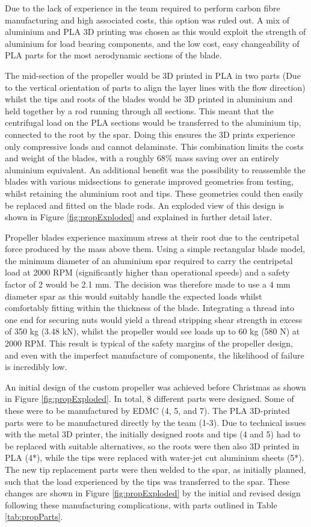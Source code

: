 Due to the lack of experience in the team required to perform carbon fibre manufacturing and high associated costs, this option was ruled out. A mix of aluminium and PLA 3D printing was chosen as this would exploit the strength of aluminium for load bearing components, and the low cost, easy changeability of PLA parts for the most aerodynamic sections of the blade.

The mid-section of the propeller would be 3D printed in PLA in two parts (Due to the vertical orientation of parts to align the layer lines with the flow direction) whilst the tips and roots of the blades would be 3D printed in aluminium and held together by a rod running through all sections. This meant that the centrifugal load on the PLA sections would be transferred to the aluminium tip, connected to the root by the spar. Doing this ensures the 3D prints experience only compressive loads and cannot delaminate. This combination limits the costs and weight of the blades, with a roughly 68\% mass saving over an entirely aluminium equivalent. An additional benefit was the possibility to reassemble the blades with various midsections to generate improved geometries from testing, whilst retaining the aluminium root and tips. These geometries could then easily be replaced and fitted on the blade rods. An exploded view of this design is shown in Figure \ref{fig:propExploded} and explained in further detail later.

Propeller blades experience maximum stress at their root due to the centripetal force produced by the mass above them. Using a simple rectangular blade model, the minimum diameter of an aluminium spar required to carry the centripetal load at 2000 RPM (significantly higher than operational speeds) and a safety factor of 2  would be 2.1 mm. The decision was therefore made to use a 4 mm diameter spar as this would suitably handle the expected loads whilst comfortably fitting within the thickness of the blade. Integrating a thread into one end for securing nuts would yield a thread stripping shear strength in excess of 350 kg (3.48 kN), whilst the propeller would see loads up to 60 kg (580 N) at 2000 RPM. This result is typical of the safety margins of the propeller design, and even with the imperfect manufacture of components, the likelihood of failure is incredibly low.

An initial design of the custom propeller was achieved before Christmas as shown in Figure \ref{fig:propExploded}. In total, 8 different parts were designed. Some of these were to be manufactured by EDMC (4, 5, and 7). The PLA 3D-printed parts were to be manufactured directly by the team (1-3). Due to technical issues with the metal 3D printer, the initially designed roots and tips (4 and 5) had to be replaced with suitable alternatives, so the roots were then also 3D printed in PLA (4*), while the tips were replaced with water-jet cut aluminium sheets (5*). The new tip replacement parts were then welded to the spar, as initially planned, such that the load experienced by the tips was transferred to the spar. These changes are shown in Figure \ref{fig:propExploded} by the initial and revised design following these manufacturing complications, with parts outlined in Table \ref{tab:propParts}.

